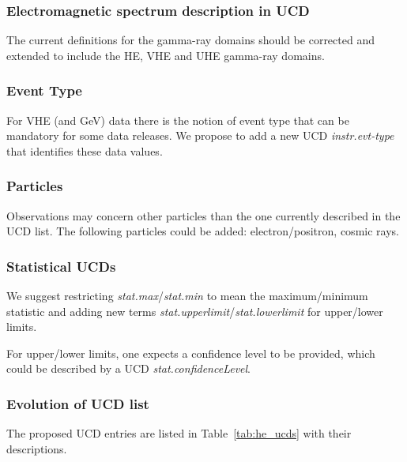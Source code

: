 \documentclass[11pt,a4paper]{ivoa}
\begin{document}
\subsubsection{Electromagnetic spectrum description in UCD}

The current definitions for the gamma-ray domains should be corrected and extended to include the \gls{HE}, \gls{VHE} and \gls{UHE} gamma-ray domains.

\subsubsection{Event Type}

For \gls{VHE} (and GeV) data there is the notion of event type that can be mandatory for some data releases.  We propose to add a new UCD {\em instr.evt-type\/} that identifies these data values.

\subsubsection{Particles}

Observations may concern other particles than the one currently described in the UCD list. The following particles could be added: electron/positron, cosmic rays.

\subsubsection{Statistical UCDs}

We suggest restricting {\em stat.max}/{\em stat.min} to mean the maximum/minimum statistic and adding new terms {\em stat.upperlimit}/{\em stat.lowerlimit} for upper/lower limits.

For upper/lower limits, one expects a confidence level to be provided, which could be described by a UCD {\em stat.confidenceLevel}.

\subsubsection{Evolution of UCD list}

The proposed UCD entries are listed in Table~\ref{tab:he_ucds} with their descriptions.
\end{document}
